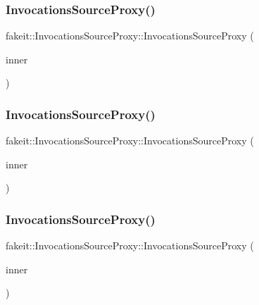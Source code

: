 \subsubsection{\texorpdfstring{InvocationsSourceProxy()}{InvocationsSourceProxy()}\hspace{0.1cm}{\footnotesize\ttfamily [5/9]}}
{\footnotesize\ttfamily fakeit\+::\+Invocations\+Source\+Proxy\+::\+Invocations\+Source\+Proxy (\begin{DoxyParamCaption}\item[{\mbox{\hyperlink{structfakeit_1_1ActualInvocationsSource}{Actual\+Invocations\+Source}} $\ast$}]{inner }\end{DoxyParamCaption})\hspace{0.3cm}{\ttfamily [inline]}}

\mbox{\label{structfakeit_1_1InvocationsSourceProxy_a2628cc72ce5694e87d7b1208dd3c6518}} 
\subsubsection{\texorpdfstring{InvocationsSourceProxy()}{InvocationsSourceProxy()}\hspace{0.1cm}{\footnotesize\ttfamily [6/9]}}
{\footnotesize\ttfamily fakeit\+::\+Invocations\+Source\+Proxy\+::\+Invocations\+Source\+Proxy (\begin{DoxyParamCaption}\item[{\mbox{\hyperlink{structfakeit_1_1ActualInvocationsSource}{Actual\+Invocations\+Source}} $\ast$}]{inner }\end{DoxyParamCaption})\hspace{0.3cm}{\ttfamily [inline]}}

\mbox{\label{structfakeit_1_1InvocationsSourceProxy_a2628cc72ce5694e87d7b1208dd3c6518}} 
\subsubsection{\texorpdfstring{InvocationsSourceProxy()}{InvocationsSourceProxy()}\hspace{0.1cm}{\footnotesize\ttfamily [7/9]}}
{\footnotesize\ttfamily fakeit\+::\+Invocations\+Source\+Proxy\+::\+Invocations\+Source\+Proxy (\begin{DoxyParamCaption}\item[{\mbox{\hyperlink{structfakeit_1_1ActualInvocationsSource}{Actual\+Invocations\+Source}} $\ast$}]{inner }\end{DoxyParamCaption})\hspace{0.3cm}{\ttfamily [inline]}}

